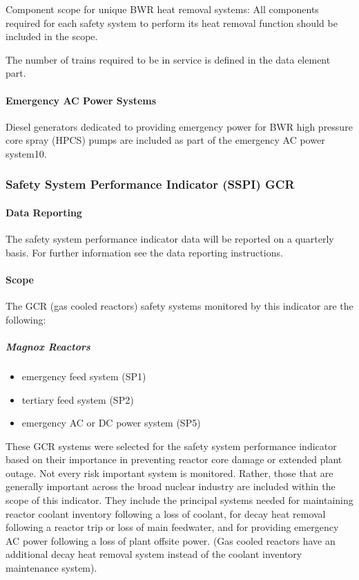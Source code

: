 Component scope for unique BWR heat removal systems:  All components
required for each safety system to perform its heat removal function
should be included in the scope.

The number of trains required to be in service is defined in the data
element part.

\paragraph{Emergency AC Power Systems}

Diesel generators dedicated to providing emergency power for BWR high
pressure core spray (HPCS) pumps are included as part of the emergency
AC power system10.


\subsubsection{Safety System Performance Indicator (SSPI) GCR}
\paragraph{Data Reporting}

The safety system performance indicator data will be reported on a
quarterly basis. For further information see the data reporting
instructions.

\paragraph{Scope}

The GCR (gas cooled reactors) safety systems monitored by this
indicator are the following:

\subparagraph{Magnox Reactors}
\begin{itemize}
\item emergency feed system (SP1)
\item tertiary feed system (SP2)
\item emergency AC or DC power system (SP5)
\end{itemize}

These GCR systems were selected for the safety system performance
indicator based on their importance in preventing reactor core damage
or extended plant outage. Not every risk important system is
monitored. Rather, those that are generally important across the broad
nuclear industry are included within the scope of this indicator. They
include the principal systems needed for maintaining reactor coolant
inventory following a loss of coolant, for decay heat removal
following a reactor trip or loss of main feedwater, and for providing
emergency AC power following a loss of plant offsite power. (Gas
cooled reactors have an additional decay heat removal system instead
of the coolant inventory maintenance system).

